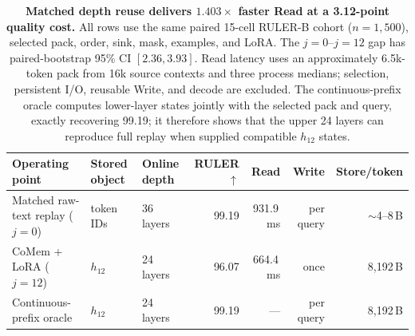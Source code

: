 \begin{table}[!t]
\centering
\small
\setlength{\tabcolsep}{3pt}
\renewcommand{\arraystretch}{1.05}
\begin{tabular}{@{}p{}p{}p{}rrrr@{}}
\toprule
\textbf{Operating point} & \textbf{Stored object} & \textbf{Online depth} &
\textbf{RULER}$\uparrow$ & \textbf{Read} & \textbf{Write} &
\textbf{Store/token} \\
\midrule
Matched raw-text replay ($j{=}0$) & token IDs & 36 layers &
99.19 & 931.9\,ms & per query & $\sim$4--8\,B \\
CoMem + LoRA ($j{=}12$) & $h_{12}$ & 24 layers &
96.07 & 664.4\,ms & once & 8,192\,B \\
Continuous-prefix oracle & $h_{12}$ & 24 layers &
99.19 & --- & per query & 8,192\,B \\
\bottomrule
\end{tabular}
\caption{\textbf{Matched depth reuse delivers $1.403\times$ faster Read at a
3.12-point quality cost.}
All rows use the same paired 15-cell RULER-B cohort ($n{=}1{,}500$), selected
pack, order, sink, mask, examples, and LoRA. The $j{=}0$--$j{=}12$ gap has
paired-bootstrap 95\% CI $[2.36,3.93]$. Read latency uses an approximately
6.5k-token pack from 16k source contexts and three process medians; selection,
persistent I/O, reusable Write, and decode are excluded. The
continuous-prefix oracle computes lower-layer states jointly with the selected
pack and query, exactly recovering 99.19; it therefore shows that the upper
24 layers can reproduce full replay when supplied compatible $h_{12}$ states.}
\label{tab:core-tradeoff}
\end{table}
